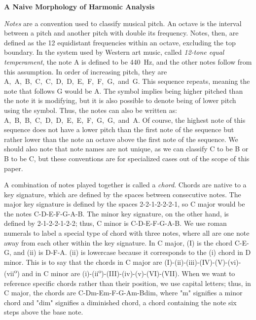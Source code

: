 \documentclass[12pt]{article}
\newcommand{\mytitle}{A Naive Morphology of Harmonic Analysis}
\begin{document}
    
    \setcounter{page}{2}
    {\centering
      \textbf{\mytitle}\par
    }
    \textit{Notes} are a convention used to classify musical pitch. An octave
    is the interval between a pitch and another pitch with double its 
    frequency. Notes, then, are defined as the 12 equidistant frequencies within
    an octave, excluding the top boundary. In the system used by Western art
    music, called \textit{12-tone equal temperament}, the note A is defined to
    be 440~Hz, and the other notes follow from this assumption. In order of
    increasing pitch, they are
    A,~A\sh,~B,~C,~C\sh,~D,~D\sh,~E,~F,~F\sh,~G,~and~G\sh. This sequence
    repeats, meaning the note that follows G\sh{} would be A\@. The \sh{}
    symbol implies being higher pitched than the note it is modifying,
    but it is also possible to denote being of lower pitch using the \fl{}
    symbol. Thus, the notes can also be written as:
    A,~B\fl,~B,~C,~D\fl,~D,~E\fl,~E,~F,~G\fl,~G,~and~A\fl. Of course, the
    highest note of this sequence does not have a lower pitch than the first
    note of the sequence but rather lower than the note an octave above the
    first note of the sequence. We should also note that note names are not
    unique, as we can classify C to be B\sh{} or B to be C\fl, but these
    conventions are for specialized cases out of the scope of this paper.

    A combination of notes played together is called a \textit{chord}. Chords
    are native to a key signature, which are defined by the spaces between
    consecutive notes. The major key signature is defined by the spaces
    2-2-1-2-2-2-1, so C major would be the notes C-D-E-F-G-A-B\@. The minor
    key signature, on the other hand, is defined by 2-1-2-2-1-2-2; thus, C
    minor is C-D-E\fl-F-G-A\fl-B\fl. We use roman numerals to label a special
    type of chord with three notes, where all are one note away from each
    other within the key signature. In C major, (\RN{1}) is the chord C-E-G,
    and (\Rn{2}) is D-F-A\@. (\Rn{2}) is lowercase because it corresponds to
    the (\Rn{1}) chord in D minor. This is to say that the chords in C major
    are (\RN{1})-(\Rn{2})-(\Rn{3})-(\RN{4})-(\RN{5})-(\Rn{6})-(\Rn{7}\textsuperscript{o})
    and in C minor are
    (\Rn{1})-(\Rn{2}\textsuperscript{o})-(\RN{3})-(\Rn{4})-(\Rn{5})-(\RN{6})-(\RN{7}).
    When we want to reference specific chords rather than their position, we
    use capital letters; thus, in C major, the chords are C-Dm-Em-F-G-Am-Bdim,
    where "m" signifies a minor chord and "dim" signifies a diminished chord,
    a chord containing the note six steps above the base note. 
\end{document}
